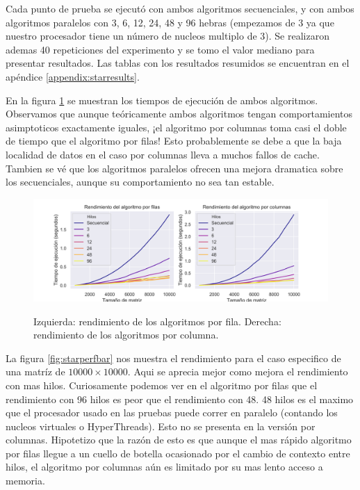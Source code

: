 \documentclass{report}
\begin{document}
Cada punto de prueba se ejecut\'o con ambos algoritmos secuenciales, y
con ambos algoritmos paralelos con 3, 6, 12, 24, 48 y 96 hebras (empezamos de
3 ya que nuestro procesador tiene un n\'umero de nucleos multiplo de 3). Se
realizaron ademas 40 repeticiones del experimento y se tomo el valor mediano
para presentar resultados. Las tablas con los resultados resumidos se encuentran
en el ap\'endice \ref{appendix:starresults}.

En la figura \ref{fig:starperf} se muestran los tiempos de ejecución de ambos
algoritmos. Observamos que aunque teóricamente ambos algoritmos tengan
comportamientos asimptoticos exactamente iguales, ¡el algoritmo por columnas toma
casi el doble de tiempo que el algoritmo por filas! Esto probablemente se debe a
que la baja localidad de datos en el caso por columnas lleva a muchos fallos de
cache. Tambien se vé que los algoritmos paralelos ofrecen una mejora dramatica
sobre los secuenciales, aunque su comportamiento no sea tan estable.

\begin{figure}[h]
    \centering
  \caption{Izquierda: rendimiento de los algoritmos por fila. Derecha: rendimiento
           de los algoritmos por columna.}
\includegraphics[width=\textwidth]{stars_perf}
\label{fig:starperf}
\end{figure}

La figura \ref{fig:starperfbar} nos muestra el rendimiento para el caso especifico
de una matríz de $10000 \times 10000$. Aqui se aprecia mejor como mejora el rendimiento con
mas hilos. Curiosamente podemos ver en el algoritmo por filas que el rendimiento
con 96 hilos es peor que el rendimiento con 48. 48 hilos es el maximo que el
procesador usado en las pruebas puede correr en paralelo (contando los nucleos
virtuales o HyperThreads). Esto no se presenta en la versión por columnas.
Hipotetizo que la razón de esto es que aunque el mas rápido algoritmo por filas
llegue a un cuello de botella ocasionado por el cambio de contexto entre hilos,
el algoritmo por columnas aún es limitado por su mas lento acceso a memoria.
\end{document}

